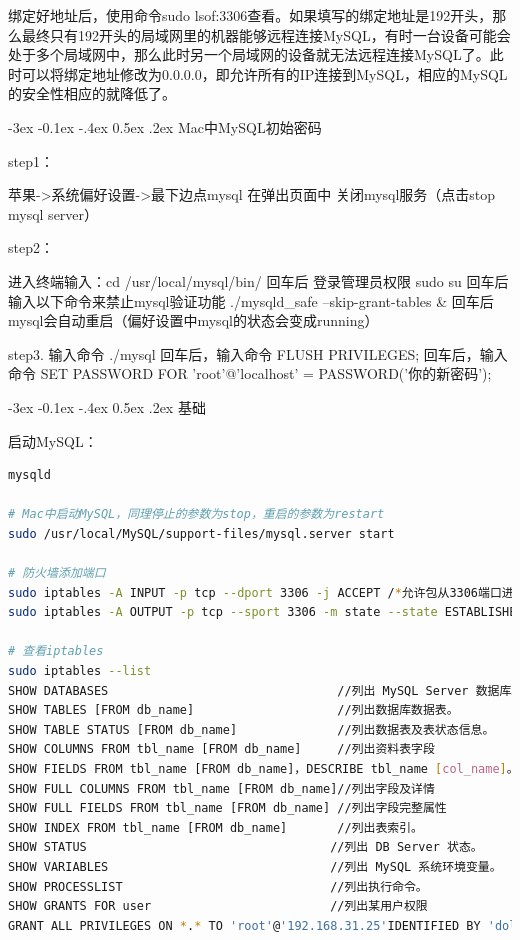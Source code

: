 \documentclass[11pt,fleqn]{book}
\makeatletter
\numberwithin{dummy}{section}
\theoremstyle{ocrenumbox}
\theoremstyle{blacknumex}
\theoremstyle{blacknumbox}
\theoremstyle{ocrenum}
\renewcommand{\subsection}{\@startsection {subsection}{2}{\z@}
	{-3ex \@plus -0.1ex \@minus -.4ex}
	{0.5ex \@plus.2ex }
	{\normalfont\sffamily\bfseries}}
\makeatother
\begin{document}
绑定好地址后，使用命令sudo lsof:3306查看。如果填写的绑定地址是192开头，那么最终只有192开头的局域网里的机器能够远程连接MySQL，有时一台设备可能会处于多个局域网中，那么此时另一个局域网的设备就无法远程连接MySQL了。此时可以将绑定地址修改为0.0.0.0，即允许所有的IP连接到MySQL，相应的MySQL的安全性相应的就降低了。

\subsection{Mac中MySQL初始密码}

step1：

苹果->系统偏好设置->最下边点mysql 在弹出页面中 关闭mysql服务（点击stop mysql server）

step2：

进入终端输入：cd /usr/local/mysql/bin/
回车后 登录管理员权限 sudo su
回车后输入以下命令来禁止mysql验证功能 ./mysqld\_safe --skip-grant-tables \&
回车后mysql会自动重启（偏好设置中mysql的状态会变成running）

step3. 
输入命令 ./mysql
回车后，输入命令 FLUSH PRIVILEGES; 
回车后，输入命令 SET PASSWORD FOR 'root'@'localhost' = PASSWORD('你的新密码');

\subsection{基础}

启动MySQL：

\begin{lstlisting}[language=Bash]
mysqld

# Mac中启动MySQL，同理停止的参数为stop，重启的参数为restart
sudo /usr/local/MySQL/support-files/mysql.server start

# 防火墙添加端口
sudo iptables -A INPUT -p tcp --dport 3306 -j ACCEPT /*允许包从3306端口进入*/
sudo iptables -A OUTPUT -p tcp --sport 3306 -m state --state ESTABLISHED -j ACCEPT /*允许从3306端口进入的包返回*/

# 查看iptables
sudo iptables --list
SHOW DATABASES                                //列出 MySQL Server 数据库。
SHOW TABLES [FROM db_name]                    //列出数据库数据表。
SHOW TABLE STATUS [FROM db_name]              //列出数据表及表状态信息。
SHOW COLUMNS FROM tbl_name [FROM db_name]     //列出资料表字段
SHOW FIELDS FROM tbl_name [FROM db_name]，DESCRIBE tbl_name [col_name]。
SHOW FULL COLUMNS FROM tbl_name [FROM db_name]//列出字段及详情
SHOW FULL FIELDS FROM tbl_name [FROM db_name] //列出字段完整属性
SHOW INDEX FROM tbl_name [FROM db_name]       //列出表索引。
SHOW STATUS                                  //列出 DB Server 状态。
SHOW VARIABLES                               //列出 MySQL 系统环境变量。
SHOW PROCESSLIST                             //列出执行命令。
SHOW GRANTS FOR user                         //列出某用户权限
GRANT ALL PRIVILEGES ON *.* TO 'root'@'192.168.31.25'IDENTIFIED BY 'dolphin' WITH GRANT OPTION;
\end{lstlisting}
\end{document}
